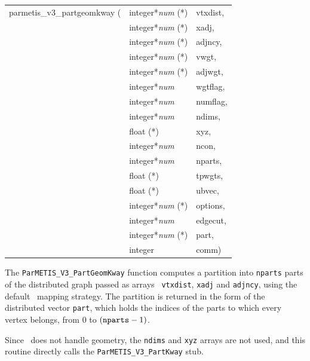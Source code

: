 \begin{itemize}
{\tt\begin{tabular}{l@{}ll}
parmetis\_v3\_partgeomkway ( & integer*{\it num} (*) & vtxdist, \\
                             & integer*{\it num} (*) & xadj, \\
                             & integer*{\it num} (*) & adjncy, \\
                             & integer*{\it num} (*) & vwgt, \\
                             & integer*{\it num} (*) & adjwgt, \\
                             & integer*{\it num}     & wgtflag, \\
                             & integer*{\it num}     & numflag, \\
                             & integer*{\it num}     & ndims, \\
                             & float (*)             & xyz, \\
                             & integer*{\it num}     & ncon, \\
                             & integer*{\it num}     & nparts, \\
                             & float (*)             & tpwgts, \\
                             & float (*)             & ubvec, \\
                             & integer*{\it num} (*) & options, \\
                             & integer*{\it num}     & edgecut, \\
                             & integer*{\it num} (*) & part, \\
                             & integer               & comm)
\end{tabular}}

\progdes

The {\tt ParMETIS\_V3\_PartGeomKway} function computes a partition into
{\tt nparts} parts of the distributed graph passed as arrays {\tt
vtxdist}, {\tt xadj} and {\tt adjncy}, using the default
\ptscotch\ mapping strategy. The partition is returned in the form of
the distributed vector {\tt part}, which holds the indices of the
parts to which every vertex belongs, from $0$ to $(\mbox{\tt nparts} -
1)$.

Since \scotch\ does not handle geometry, the {\tt ndims} and {\tt xyz}
arrays are not used, and this routine directly calls the
{\tt ParMETIS\_\lbt V3\_\lbt Part\lbt Kway} stub.
\end{itemize}

